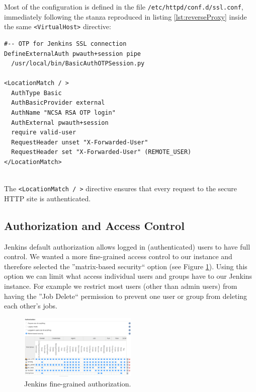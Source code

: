 \documentclass[10pt, conference, compsocconf]{IEEEtran}
\begin{document}
Most of the configuration is defined in the file \texttt{/etc/httpd/conf.d/ssl.conf}, immediately following the stanza reproduced in listing \ref{lst:reverseProxy} inside the same \texttt{<VirtualHost>} directive:

\begin{lstlisting}
#-- OTP for Jenkins SSL connection
DefineExternalAuth pwauth+session pipe 
  /usr/local/bin/BasicAuthOTPSession.py

<LocationMatch / > 
  AuthType Basic
  AuthBasicProvider external
  AuthName "NCSA RSA OTP login" 
  AuthExternal pwauth+session
  require valid-user  
  RequestHeader unset "X-Forwarded-User"
  RequestHeader set "X-Forwarded-User" (REMOTE_USER)
</LocationMatch>
 
\end{lstlisting}
The \texttt{<LocationMatch / >} directive ensures that every request to the secure HTTP site is authenticated. 

\subsection{Authorization and Access Control}
\label{subsec:authorization}

Jenkins default authorization allows logged in (authenticated) users to have full control. 
We wanted a more fine-grained access control to our instance and therefore selected the ''matrix-based security`` option (see Figure \ref{fig:jenkinsAuthorization}). Using this option we can limit what access individual users and groups have to our Jenkins instance. 
For example we restrict most users (other than admin users) from having the ''Job Delete`` permission to prevent one user or group from deleting each other's jobs. 

\begin{figure}[h]
\centering
\includegraphics[width=0.5\textwidth]{Configure-Global-Security}
\caption{Jenkins fine-grained authorization.}
\label{fig:jenkinsAuthorization}
\end{figure}
\end{document}
